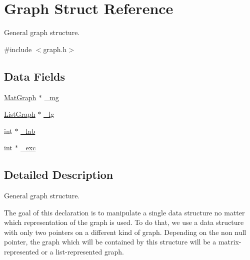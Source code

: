 \hypertarget{struct_graph}{\section{Graph Struct Reference}
\label{struct_graph}
}


General graph structure.  




{\ttfamily \#include $<$graph.\-h$>$}

\subsection*{Data Fields}
\begin{DoxyCompactItemize}
\item 
\hyperlink{struct_mat_graph}{Mat\-Graph} $\ast$ \hyperlink{struct_graph_a51971f3ef499f66e11de0883ac4634d4}{\-\_\-mg}
\item 
\hyperlink{struct_list_graph}{List\-Graph} $\ast$ \hyperlink{struct_graph_a6e87444e20688d2c6b29018a1e19545a}{\-\_\-lg}
\item 
int $\ast$ \hyperlink{struct_graph_a3d4aadf6e58d62691fef211a1d405507}{\-\_\-lab}
\item 
int $\ast$ \hyperlink{struct_graph_a723723021a032fc4140eec215ab3cdde}{\-\_\-exc}
\end{DoxyCompactItemize}


\subsection{Detailed Description}
General graph structure. 

The goal of this declaration is to manipulate a single data structure no matter which representation of the graph is used. To do that, we use a data structure with only two pointers on a different kind of graph. Depending on the non null pointer, the graph which will be contained by this structure will be a matrix-\/represented or a list-\/represented graph. 

